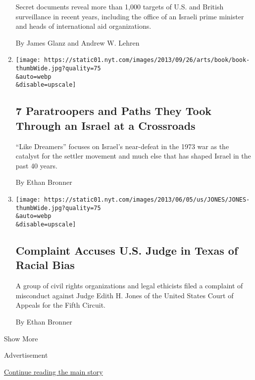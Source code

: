 \begin{enumerate}
  Secret documents reveal more than 1,000 targets of U.S. and British
  surveillance in recent years, including the office of an Israeli prime
  minister and heads of international aid organizations.

  By James Glanz and Andrew W. Lehren
\item
  \href{/2013/09/26/books/yossi-klein-halevis-like-dreamers-focuses-on-1973-war.html}{}

  \texttt{[image: https://static01.nyt.com/images/2013/09/26/arts/book/book-thumbWide.jpg?quality=75\\\&auto=webp\\\&disable=upscale]}

  \hypertarget{7-paratroopers-and-paths-they-took-through-an-israel-at-a-crossroads}{%
  \subsection{7 Paratroopers and Paths They Took Through an Israel at a
  Crossroads}\label{7-paratroopers-and-paths-they-took-through-an-israel-at-a-crossroads}}

  ``Like Dreamers'' focuses on Israel's near-defeat in the 1973 war as
  the catalyst for the settler movement and much else that has shaped
  Israel in the past 40 years.

  By Ethan Bronner
\item
  \href{/2013/06/05/us/federal-judge-in-texas-is-accused-of-racial-bias.html}{}

  \texttt{[image: https://static01.nyt.com/images/2013/06/05/us/JONES/JONES-thumbWide.jpg?quality=75\\\&auto=webp\\\&disable=upscale]}

  \hypertarget{complaint-accuses-us-judge-in-texas-of-racial-bias}{%
  \subsection{Complaint Accuses U.S. Judge in Texas of Racial
  Bias}\label{complaint-accuses-us-judge-in-texas-of-racial-bias}}

  A group of civil rights organizations and legal ethicists filed a
  complaint of misconduct against Judge Edith H. Jones of the United
  States Court of Appeals for the Fifth Circuit.

  By Ethan Bronner
\end{enumerate}

Show More

Advertisement

\protect\hyperlink{after-mid2}{Continue reading the main story}

